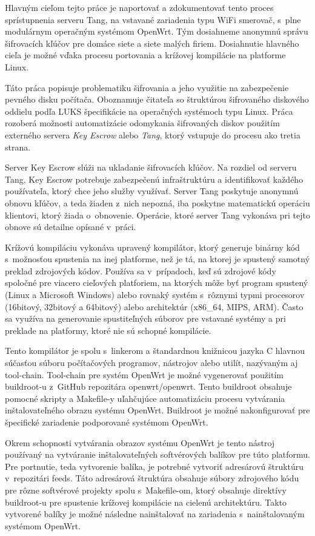 Hlavným cieľom tejto práce je naportovať a zdokumentovať tento proces sprístupnenia serveru Tang, na vstavané zariadenia typu WiFi smerovač, s~plne modulárnym operačným systémom OpenWrt.
Tým dosiahneme anonymnú správu šifrovacích kľúčov pre domáce siete a siete malých firiem.
Dosiahnutie hlavného cieľa je možné vďaka procesu portovania a krížovej kompilácie na platforme Linux.

Táto práca popisuje problematiku šifrovania a jeho využitie na zabezpečenie pevného disku počítača.
Oboznamuje čitateľa so štruktúrou šifrovaného diskového oddielu podľa LUKS špecifikácie na operačných systémoch typu Linux.
Práca rozoberá možnosti {au\-to\-ma\-ti\-zá\-cie} odomykania šifrovaných diskov použitím externého servera {\it Key Escrow} alebo {\it Tang}, ktorý vstupuje do procesu ako tretia strana.

Server Key Escrow slúži na ukladanie šifrovacích kľúčov.
Na rozdiel od serveru Tang, Key Escrow potrebuje zabezpečenú infraštruktúru a identifikovať každého používateľa, ktorý chce jeho služby využívať.
Server Tang poskytuje anonymnú obnovu kľúčov, a teda žiaden z~nich nepozná, iba poskytne matematickú operáciu klientovi, ktorý žiada o~obnovenie.
Operácie, ktoré server Tang vykonáva pri tejto obnove sú detailne opísané v~práci.

Krížovú kompiláciu vykonáva upravený kompilátor, ktorý generuje binárny kód s mož\-nos\-ťou spustenia na inej platforme, než je tá, na ktorej je spustený samotný preklad zdrojových kódov.
Používa sa v~prípadoch, keď sú zdrojové kódy spoločné pre viacero cieľových platforiem, na ktorých môže byť program spustený (Linux a Microsoft Windows) alebo rovnaký systém s~rôznymi typmi procesorov (16bitový, 32bitový a 64bitový) alebo architektúr (x86\_64, MIPS, ARM).
Často sa využíva na generovanie spustiteľných súborov pre vstavané systémy a pri preklade na platformy, ktoré nie sú schopné kompilácie.

Tento kompilátor je spolu s~linkerom a štandardnou knižnicou jazyka C hlavnou súčasťou súboru počítačových programov, nástrojov alebo utilít, nazývaným aj tool-chain.
\mbox{Tool-chain} pre systém OpenWrt je možné vygenerovať použitím buildroot-u z~GitHub repozitára \mbox{openwrt/openwrt}.
Tento buildroot obsahuje pomocné skripty a Makefile-y uľahčujúce automatizáciu procesu vytvárania inštalovateľného obrazu systému OpenWrt.
Buildroot je možné nakonfigurovať pre špecifické zariadenie podporované systémom OpenWrt.

Okrem schopnosti vytvárania obrazov systému OpenWrt je tento nástroj používaný na vytváranie inštalovateľných softvérových balíkov pre túto platformu.
Pre portnutie, teda vytvorenie balíka, je potrebné vytvoriť adresárovú štruktúru v~repozitári feeds.
Táto adresárová štruktúra obsahuje súbory zdrojového kódu pre rôzne softvérové projekty spolu s~Makefile-om, ktorý obsahuje direktívy buildroot-u pre spustenie krížovej kompilácie na cielenú architektúru.
Takto vytvorené balíky je možné následne nainštalovať na zariadenia s~nainštalovaným systémom OpenWrt.

